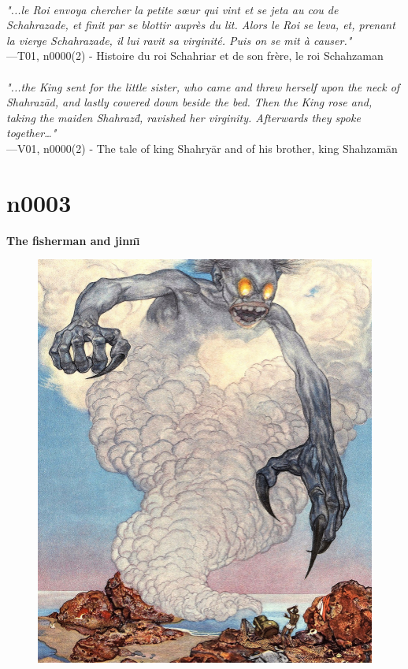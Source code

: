 \documentclass[../Carre_nights.tex]{subfiles}
\begin{document}
\textit{\\
"...le Roi envoya chercher la petite sœur qui vint et se jeta au cou de Schahrazade, et finit par se blottir auprès du lit. Alors le Roi se leva, et, prenant la vierge Schahrazade, il lui ravit sa virginité. Puis on se mit à causer."} \\
—T01, n0000(2) - Histoire du roi Schahriar et de son frère, le roi Schahzaman \\~\\
\textit{"...the King sent for the little sister, who came and threw herself upon the neck of Shahraz\=ad, and lastly cowered down beside the bed. Then the King rose and, taking the maiden Shahraz\=d, ravished her virginity. Afterwards they spoke together…"} \\
—V01, n0000(2) - The tale of king Shahry\=ar and of his brother, king Shahzam\=an

\newpage

\section{n0003}
\textbf{\Large{The fisherman and jinn\={\i}}} \\

\begin{figure}[ht]
\centering
\includegraphics[height=\figsize]{illustrations/volume_1/T01, n0003 - Histoire du pécheur avec l’éfrit.jpg}
\end{figure}
\end{document}
